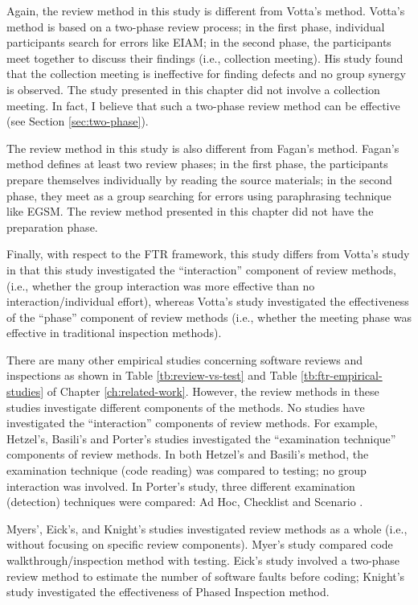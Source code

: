 Again, the review method in this study is different from Votta's
method. Votta's method is based on a two-phase review process; in the first
phase, individual participants search for errors like EIAM; in
the second phase, the participants meet together to discuss their findings
(i.e., collection meeting). His study found that the collection
meeting is ineffective for finding defects and no group synergy is
observed. The study presented in this chapter did not involve a
collection meeting. In fact, I believe that such a two-phase
review method can be effective (see Section \ref{sec:two-phase}). 

The review method in this study is also different from Fagan's
method. Fagan's 
method defines at least two review phases; in the first phase, the
participants prepare themselves individually by reading the source
materials; in the second phase, they meet as a group
searching for errors using paraphrasing technique like EGSM. 
The review method presented in this chapter did not have the
preparation phase. 

Finally, with respect to the FTR framework, 
this study differs from Votta's study in that
this study investigated the ``interaction'' component of review methods,
(i.e., whether the group interaction was more effective than no
interaction/individual effort), whereas Votta's study
investigated the effectiveness 
of the ``phase'' component of review methods (i.e., whether
the meeting phase was effective in traditional inspection methods).

There are many other empirical studies concerning software
reviews and inspections as shown in Table \ref{tb:review-vs-test}
and Table \ref{tb:ftr-empirical-studies} of Chapter
\ref{ch:related-work}.
However, the review methods in these studies investigate different
components of the methods. No studies have investigated the 
``interaction'' components of review methods.
For example,
Hetzel's, Basili's and Porter's studies \cite{Hetzel76,Basili87}
investigated the ``examination technique'' components of review
methods. 
In both Hetzel's and Basili's method, the examination technique (code
reading) was compared to testing; no group interaction was
involved. In Porter's study, three different examination (detection)
techniques were compared: Ad Hoc, Checklist and Scenario
\cite{Porter94}. 

Myers', Eick's, and Knight's studies \cite{Myers78,Eick92,Knight93}
investigated review methods as a whole  
(i.e., without focusing on specific review components). 
Myer's study compared code walkthrough/inspection method with testing.
Eick's study involved a two-phase review method to
estimate the number of software faults before coding; Knight's study
investigated the effectiveness of Phased Inspection method.

